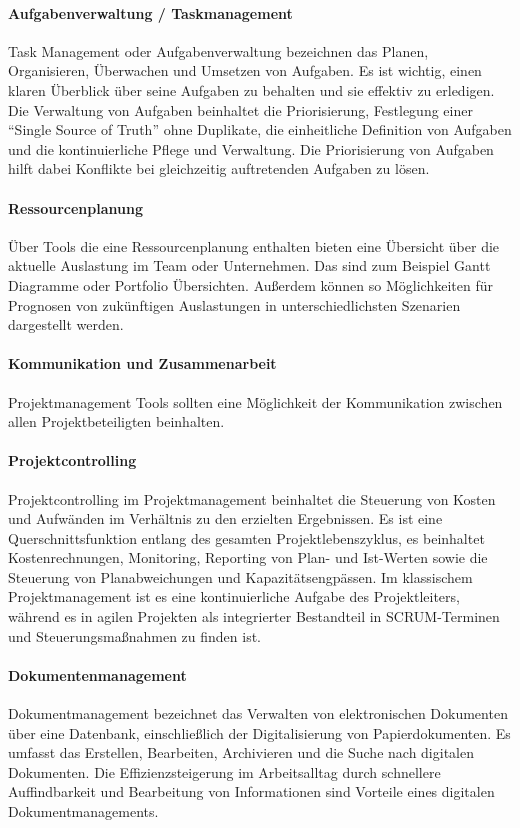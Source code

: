 \documentclass[sigconf, nonacm]{acmart}
\begin{document}
\paragraph{Aufgabenverwaltung / Taskmanagement}
Task Management oder Aufgabenverwaltung bezeichnen das Planen, Organisieren, Überwachen und Umsetzen von Aufgaben. Es ist wichtig, einen klaren Überblick über seine Aufgaben zu behalten und sie effektiv zu erledigen. 
Die Verwaltung von Aufgaben beinhaltet die Priorisierung, Festlegung einer \enquote{Single Source of Truth} ohne Duplikate, die einheitliche Definition von Aufgaben und die kontinuierliche Pflege und Verwaltung. 
Die Priorisierung von Aufgaben hilft dabei Konflikte bei gleichzeitig auftretenden Aufgaben zu lösen.~\cite{venzmer_task_2020}

\paragraph{Ressourcenplanung}
Über Tools die eine Ressourcenplanung enthalten bieten eine Übersicht über die aktuelle Auslastung im Team oder Unternehmen. Das sind zum Beispiel Gantt Diagramme oder Portfolio Übersichten. Außerdem können so Möglichkeiten für Prognosen von zukünftigen Auslastungen in unterschiedlichsten Szenarien dargestellt werden.~\cite{venzmer_wie_2020}

\paragraph{Kommunikation und Zusammenarbeit}
Projektmanagement Tools sollten eine Möglichkeit der Kommunikation zwischen allen Projektbeteiligten beinhalten.

\paragraph{Projektcontrolling}
Projektcontrolling im Projektmanagement beinhaltet die Steuerung von Kosten und Aufwänden im Verhältnis zu den erzielten Ergebnissen. Es ist eine Querschnittsfunktion entlang des gesamten Projektlebenszyklus, es beinhaltet Kostenrechnungen, Monitoring, Reporting von Plan- und Ist-Werten sowie die Steuerung von Planabweichungen und Kapazitätsengpässen. Im klassischem Projektmanagement ist es eine kontinuierliche Aufgabe des Projektleiters, während es in agilen Projekten als integrierter Bestandteil in SCRUM-Terminen und Steuerungsmaßnahmen zu finden ist.~\cite{venzmer_projektcontrolling-tool_2020}

\paragraph{Dokumentenmanagement}
Dokumentmanagement bezeichnet das Verwalten von elektronischen Dokumenten über eine Datenbank, einschließlich der Digitalisierung von Papierdokumenten. Es umfasst das Erstellen, Bearbeiten, Archivieren und die Suche nach digitalen Dokumenten. Die Effizienzsteigerung im Arbeitsalltag durch schnellere Auffindbarkeit und Bearbeitung von Informationen sind Vorteile eines digitalen Dokumentmanagements.~\cite{schmuck_dokumentenmanagement_2019}
\end{document}
